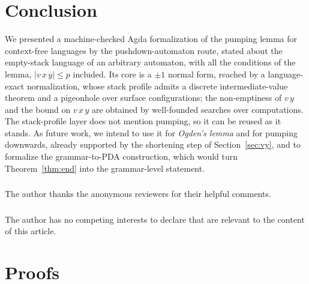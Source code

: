 \documentclass[runningheads]{llncs}
\begin{document}
\section{Conclusion}\label{sec:conclusion}

We presented a machine-checked Agda formalization of the pumping lemma for
context-free languages by the pushdown-automaton route, stated about the
empty-stack language of an arbitrary automaton, with all the conditions of
the lemma, $|v\,x\,y| \leq p$ included. Its core is a $\pm 1$ normal form, reached by a
language-exact normalization, whose stack profile admits a discrete
intermediate-value theorem and a pigeonhole over surface configurations; the
non-emptiness of $v\,y$ and the bound on $v\,x\,y$ are obtained by well-founded
searches over computations. The stack-profile layer does not mention pumping, so
it can be reused as it stands. As future work, we intend to use it for
\emph{Ogden's lemma} and for pumping downwards, already supported by the
shortening step of Section~\ref{sec:vy}, and to formalize the grammar-to-PDA
construction, which would turn Theorem~\ref{thm:end} into the grammar-level
statement.

\begin{credits}
\subsubsection{\ackname}
The author thanks the anonymous reviewers for their helpful comments.

\subsubsection{\discintname}
The author has no competing interests to declare that are relevant to the
content of this article.
\end{credits}




\newpage
\appendix
\section{Proofs}\label{app:proofs}
\end{document}
